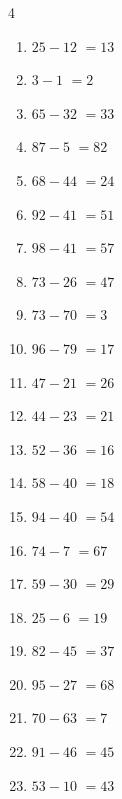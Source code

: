 \begin{multicols}{4}
\begin{enumerate}
  \item $25-12$
        $=13$

  \item $3-1$
        $=2$

  \item $65-32$
        $=33$

  \item $87-5$
        $=82$

  \item $68-44$
        $=24$

  \item $92-41$
        $=51$

\columnbreak %

  \item $98-41$
        $=57$

  \item $73-26$
        $=47$

  \item $73-70$
        $=3$

  \item $96-79$
        $=17$

  \item $47-21$
        $=26$

  \item $44-23$
        $=21$

  \item $52-36$
        $=16$

  \item $58-40$
        $=18$

  \item $94-40$
        $=54$

  \item $74-7$
        $=67$

  \item $59-30$
        $=29$

  \item $25-6$
        $=19$

  \item $82-45$
        $=37$

  \item $95-27$
        $=68$

  \item $70-63$
        $=7$

  \item $91-46$
        $=45$

  \item $53-10$
        $=43$


\end{enumerate}
\end{multicols}
